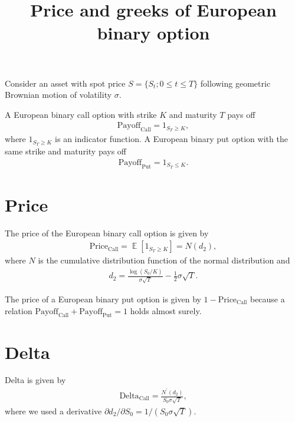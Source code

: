 \documentclass{article}
\newcommand\Ex{\mathop{\mathbb{E}}}
\begin{document}
\title{Price and greeks of European binary option}
\date{}

\maketitle


Consider an asset with spot price $S = \{S_t; 0 \leq t \leq T\}$ following geometric Brownian motion of volatility $\sigma$.

A European binary call option with strike $K$ and maturity $T$ pays off
\begin{align}
    \text{Payoff}_\text{Call}
        = 1_{S_T \geq K} ,
\end{align}
where
$1_{S_T \geq K}$ is an indicator function.
A European binary put option with the same strike and maturity pays off
\begin{align}
    \text{Payoff}_\text{Put}
        = 1_{S_T \leq K} .
\end{align}



\section*{Price}


The price of the European binary call option is given by
\begin{align}
    \text{Price}_\text{Call}
        = \Ex[1_{S_T \geq K}] = N(d_2) ,
\end{align}
where
$N$ is the cumulative distribution function of the normal distribution and
\begin{align}
    d_2
        = \frac{\log (S_0 / K)}{\sigma \sqrt{T}} - \frac12 \sigma \sqrt{T} .
\end{align}

The price of a European binary put option is given by $1 - \text{Price}_\text{Call}$
because a relation $\text{Payoff}_\text{Call} + \text{Payoff}_\text{Put} = 1$ holds almost surely.


\section*{Delta}


Delta is given by
\begin{align}
    \text{Delta}_\text{Call}
        = \frac{N^\prime(d_2)}{S_0 \sigma \sqrt{T}} ,
\end{align}
where
we used a derivative $\partial d_2 / \partial S_0 = 1 / (S_0 \sigma \sqrt{T})$.
\end{document}
